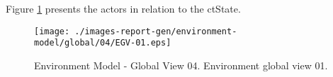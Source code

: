 \clearpage

Figure \ref{fig:lu.uni.lassy.excalibur.MyCrash.G02-EM-view-global-04} presents the actors in relation to the ctState.


\begin{figure}[htbp] 
\label{fig:lu.uni.lassy.excalibur.MyCrash.G02-EM}
\begin{center}
\texttt{[image: ./images-report-gen/environment-model/global/04/EGV-01.eps]}
\end{center}
\caption[Environment Model - Global View 04 - Environment global view 01]{Environment Model - Global View 04. Environment global view 01.}
\label{fig:lu.uni.lassy.excalibur.MyCrash.G02-EM-view-global-04}
\end{figure}
\vspace{0.5cm} 
